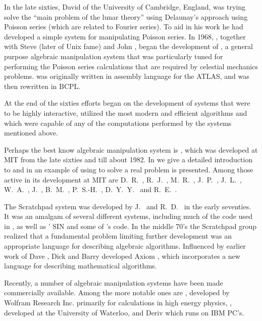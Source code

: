 In the late sixties, David {\BartonDRa} of the University of
Cambridge, England, was trying solve the ``main problem of the lunar
theory'' using Delaunay's approach using Poisson series (which are
related to Fourier series).  To aid in his work he had developed a
simple system for manipulating Poisson series.  In 1968, {\BartonDRa},
together with Steve {\Bourne} (later of Unix fame) and John {\Fitch},
began the development of {\Camal} \cite{Fitch1975-sn}, a general purpose
algebraic manipulation system that was particularly tuned for
performing the Poisson series calculations that are required by
celestial mechanics problems.  {\Camal} was originally written in
assembly language for the ATLAS, and was then rewritten in BCPL.

At the end of the sixties efforts began on the development of systems that
were to be highly interactive, utilized the most modern and efficient
algorithms and which were capable of any of the computations performed by
the systems mentioned above.

Perhaps the best know algebraic manipulation system is {\Macsyma}, which
was developed at MIT from the late sixties and till about 1982.  In
 we give a detailed introduction to
{\Macsyma} and in  an example of using
{\Macsyma} to solve a real problem is presented.  Among those active
in its development at MIT are D.~R.~{\BartonDRb}, R.~J.~{\Fateman},
M.~R.~{\Genesereth}, J.~P.~{\Golden}, J.~L.~{\Kulp}, W.~A.~{\MartinW},
J.~{\MosesJ}, B.~M.~{\Trager}, P.~S.-H.~{\WangP}, D.~Y.~Y.~{\Yun} and
R.~E.~{\Zippel}.

The Scratchpad system was developed by J.~{\Griesmer} and R.~D.~{\Jenks} in
the early seventies.  It was an amalgam of several different systems,
including much of the code used in {\Mathlab}, as well as {\MosesJ}' SIN
and some of {\MartinW}'s code.  In the middle 70's the Scratchpad group
realized that a fundamental problem limiting further development was
an appropriate language for describing algebraic algorithms.
Influenced by earlier work of Dave {\BartonDRb}, Dick {\Jenks} and Barry
{\Trager} developed Axiom \cite{Jenks1992-cu}, which incorporates a new
language for describing mathematical algorithms.

 
Recently, a number of algebraic manipulation systems have been made
commercially available.  Among the more notable ones are {\Mathematica}
\cite{Wolfram1988-cy}, developed by Wolfram Research Inc. primarily for
calculations in high energy physics, {\Maple} \cite{noauthor_1987-fl},
developed at the University of Waterloo, and Deriv which runs on IBM
PC's.

